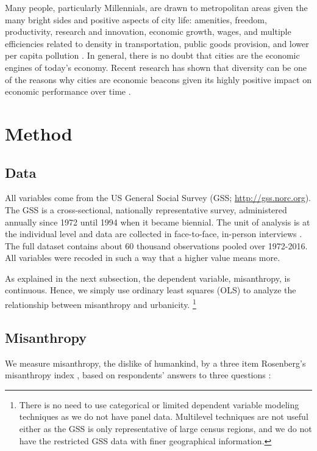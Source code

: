 \documentclass[11pt, letterpaper]{article}
\begin{document}
\begin{spacing}{1.4}
Many people, particularly Millennials, are drawn to metropolitan areas \citep{aok-swbGenYcity18} given the many bright sides and positive aspects of city life: amenities, freedom, productivity, research and innovation, economic growth, wages, and multiple efficiencies related to
density in transportation, public goods provision, and lower per capita pollution \citep{tonnies57,osullivan09,meyer13,rosenthal02,bettencourt10}.
In general, there is no doubt that cities are the economic engines of today's economy. Recent research has shown that diversity can be one of the reasons why cities are economic beacons given its highly positive impact on economic performance over time \citep[e.g.,][]{rodriguez2019does}. 
%


\section*{Method} 

\subsection*{Data}

All variables come from the US General Social Survey (GSS;
\url{http://gss.norc.org}). The GSS is a cross-sectional, nationally
representative survey, administered annually since 1972 until 1994 when it
became biennial. The unit of analysis is at the individual level and data are collected in face-to-face, in-person interviews \citep{davis07}. The full dataset contains about 60 thousand observations pooled over 1972-2016. All variables were recoded in such a way that a higher value means more. 

As explained in the next subsection, the dependent variable, misanthropy, is continuous. Hence, we simply use ordinary least squares (OLS) to analyze the relationship between misanthropy and urbanicity.
\footnote{There is no need to use categorical or limited dependent variable modeling techniques as we do not have panel data. Multilevel techniques are not useful either as the GSS is only representative of large census regions, and we do not have the restricted GSS data with finer geographical information.} 

\subsection*{Misanthropy}

We measure misanthropy, the dislike of humankind, by a three item  Rosenberg's  misanthropy index \citep{rosenberg56}, based on respondents' answers to three questions \citep{smith97}:\\


\end{spacing}
\end{document}
